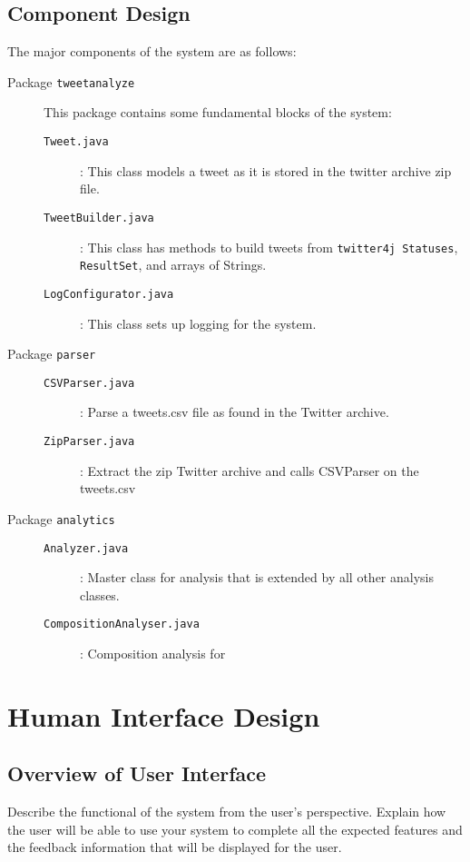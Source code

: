 \documentclass[a4paper, 12pt]{article}
\begin{document}
\subsection{Component Design} \label{sec:component}
\begin{adjustwidth}{1em}{0pt}
The major components of the system are as follows:
\begin{description}
	\item[Package \texttt{tweetanalyze}] This package contains some fundamental blocks of the system:
		\begin{description}
		\item[\texttt{Tweet.java}] : This class models a tweet as it is stored in the twitter archive zip file.
		\item[\texttt{TweetBuilder.java}] : This class has methods to build tweets from \texttt{twitter4j Statuses}, \texttt{ResultSet}, and arrays of Strings.
		\item[\texttt{LogConfigurator.java}] : This class sets up logging for the system.
		\end{description}
	\item[Package \texttt{parser}]
		\begin{description}
		\item[\texttt{CSVParser.java}] : Parse a tweets.csv file as found in the Twitter archive.
		\item[\texttt{ZipParser.java}] : Extract the zip Twitter archive and calls CSVParser on the tweets.csv
	\end{description}	
	\item[Package \texttt{analytics}]
		\begin{description}
		\item[\texttt{Analyzer.java}] : Master class for analysis that is extended by all other analysis classes.
		\item[\texttt{CompositionAnalyser.java}] : Composition analysis for 
	\end{description}	
\end{description}
\end{adjustwidth}

\section{Human Interface Design} \label{sec:human}
\subsection{Overview of User Interface} \label{sec:ui}
\begin{adjustwidth}{2em}{0pt}
Describe the functional of the system from the user’s perspective. Explain how the user will be able to use your system to complete all the expected features and the feedback information that will be displayed for the user.
\end{adjustwidth}
\end{document}
